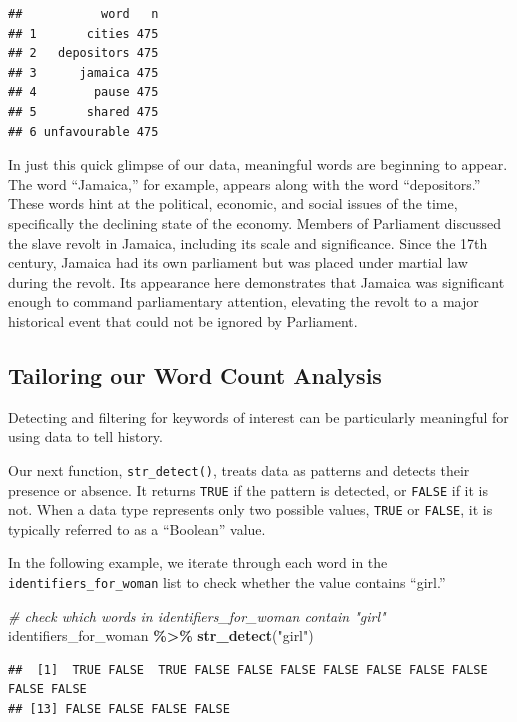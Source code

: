 \documentclass[
]{article}
\newenvironment{Shaded}{\begin{snugshade}}{\end{snugshade}}
\newcommand{\CommentTok}[1]{\textcolor[rgb]{0.56,0.35,0.01}{\textit{#1}}}
\newcommand{\FunctionTok}[1]{\textcolor[rgb]{0.13,0.29,0.53}{\textbf{#1}}}
\newcommand{\NormalTok}[1]{#1}
\newcommand{\SpecialCharTok}[1]{\textcolor[rgb]{0.81,0.36,0.00}{\textbf{#1}}}
\newcommand{\StringTok}[1]{\textcolor[rgb]{0.31,0.60,0.02}{#1}}
\begin{document}
\begin{verbatim}
##           word   n
## 1       cities 475
## 2   depositors 475
## 3      jamaica 475
## 4        pause 475
## 5       shared 475
## 6 unfavourable 475
\end{verbatim}

In just this quick glimpse of our data, meaningful words are beginning
to appear. The word ``Jamaica,'' for example, appears along with the
word ``depositors.'' These words hint at the political, economic, and
social issues of the time, specifically the declining state of the
economy. Members of Parliament discussed the slave revolt in Jamaica,
including its scale and significance. Since the 17th century, Jamaica
had its own parliament but was placed under martial law during the
revolt. Its appearance here demonstrates that Jamaica was significant
enough to command parliamentary attention, elevating the revolt to a
major historical event that could not be ignored by Parliament.

\subsection{Tailoring our Word Count
Analysis}\label{tailoring-our-word-count-analysis}

Detecting and filtering for keywords of interest can be particularly
meaningful for using data to tell history.

Our next function, \texttt{str\_detect()}, treats data as patterns and
detects their presence or absence. It returns \texttt{TRUE} if the
pattern is detected, or \texttt{FALSE} if it is not. When a data type
represents only two possible values, \texttt{TRUE} or \texttt{FALSE}, it
is typically referred to as a ``Boolean'' value.

In the following example, we iterate through each word in the
\texttt{identifiers\_for\_woman} list to check whether the value
contains ``girl.''

\begin{Shaded}
\begin{Highlighting}[]
\CommentTok{\# check which words in \textquotesingle{}identifiers\_for\_woman\textquotesingle{} contain "girl"}
\NormalTok{identifiers\_for\_woman }\SpecialCharTok{\%\textgreater{}\%} 
  \FunctionTok{str\_detect}\NormalTok{(}\StringTok{"girl"}\NormalTok{)}
\end{Highlighting}
\end{Shaded}

\begin{verbatim}
##  [1]  TRUE FALSE  TRUE FALSE FALSE FALSE FALSE FALSE FALSE FALSE FALSE FALSE
## [13] FALSE FALSE FALSE FALSE
\end{verbatim}
\end{document}
